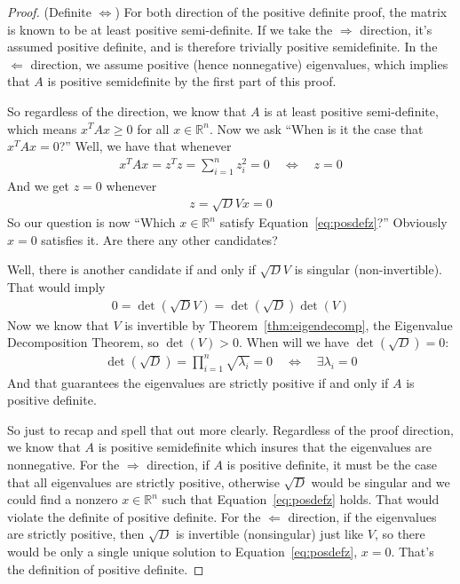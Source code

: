 \documentclass[12pt]{article}
\numberwithin{equation}{section} %
\theoremstyle{plain}
\theoremstyle{definition}
\theoremstyle{remark}
\newcommand{\Rn}{\mathbb{R}^n}
\begin{document}
\begin{proof}
(Definite $\Leftrightarrow$)
For both direction of the positive definite proof, the matrix is known
to be at least positive semi-definite.  If we take the $\Rightarrow$
direction, it's assumed positive definite, and is therefore trivially
positive semidefinite. In the $\Leftarrow$ direction, we assume positive
(hence nonnegative) eigenvalues, which implies that $A$ is positive
semidefinite by the first part of this proof.

So regardless of the direction, we know that $A$ is at least positive
semi-definite, which means $x^TAx\geq 0$ for all $x\in\Rn$. Now we ask
``When is it the case that $x^T A x= 0$?'' Well, we have that whenever
\begin{align*}
  x^T A x = z^T z = \sum^n_{i=1} z^2_i = 0
  \quad\Leftrightarrow\quad
  z=0
\end{align*}
And we get $z=0$ whenever
\begin{align}
  \label{eq:posdefz}
  z = \sqrt{D}V x = 0
\end{align}
So our question is now ``Which $x\in\Rn$ satisfy
Equation~\ref{eq:posdefz}?'' Obviously $x=0$ satisfies it. Are there any
other candidates?

Well, there is another candidate if and only if $\sqrt{D}V$ is singular
(non-invertible). That would imply
\begin{align*}
  0 = \det\left(\sqrt{D}V\right)
  = \det\left(\sqrt{D}\right) \det\left(V\right)
\end{align*}
Now we know that $V$ is invertible by Theorem~\ref{thm:eigendecomp}, the
Eigenvalue Decomposition Theorem, so $\det(V)>0$. When will we
have $\det\left(\sqrt{D}\right)=0$:
\begin{align*}
  \det\left(\sqrt{D}\right)= \prod_{i=1}^n \sqrt{\lambda_i} =0
  \quad\Leftrightarrow\quad
  \exists \lambda_i = 0
\end{align*}
And that guarantees the eigenvalues are strictly positive if and only if
$A$ is positive definite.

So just to recap and spell that out more clearly. Regardless of the
proof direction, we know that $A$ is positive semidefinite which insures
that the eigenvalues are nonnegative. For the $\Rightarrow$ direction,
if $A$ is positive definite, it must be the case that all eigenvalues
are strictly positive, otherwise $\sqrt{D}$ would be singular and we
could find a nonzero $x\in\Rn$ such that Equation~\ref{eq:posdefz}
holds. That would violate the definite of positive definite.
For the $\Leftarrow$ direction, if the eigenvalues are strictly
positive, then $\sqrt{D}$ is invertible (nonsingular) just like $V$, so
there would be only a single unique solution to
Equation~\ref{eq:posdefz}, $x=0$. That's the definition of positive
definite.
\end{proof}
\end{document}
